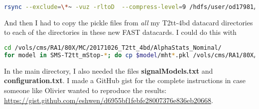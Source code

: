 \begin{lstlisting}[belowskip=-0.7cm, language=sh, numbers=none]
rsync --exclude=\*~ -vuz -rltoD  --compress-level=9 /hdfs/user/od17981/FAST-RA1/<dir> ebhal@lx01.hep.ph.ic.ac.uk:"/vols/cms/RA1/80X/MC/$(date '+%Y%m%d')_FAST-RA1_datacards_T2tt-4bd/"
\end{lstlisting}

And then I had to copy the pickle files from \emph{all} my T2tt-4bd datacard directories to each of the directories in these new FAST datacards. I could do this with

\begin{lstlisting}[belowskip=-0.7cm, language=sh, numbers=none]
cd /vols/cms/RA1/80X/MC/20171026_T2tt_4bd/AlphaStats_Nominal/
for model in SMS-T2tt_mStop-*; do cp $model/mht*.pkl /vols/cms/RA1/80X/MC/<new_dir>/${model}/; done
\end{lstlisting}

In the main directory, I also needed the files \textbf{signalModels.txt} and \textbf{configuration.txt}. I made a GitHub gist for the complete instructions in case someone like Olivier wanted to reproduce the results: \url{https://gist.github.com/eshwen/d6955bf1febfe28007376e836eb20668}.
